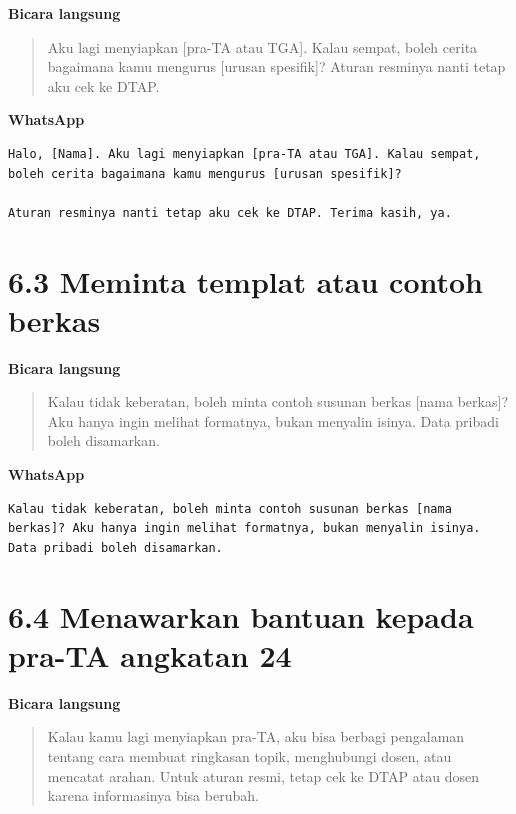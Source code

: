 \documentclass[
  indonesian,
]{article}
\renewcommand{\subsection}{\section}
\begin{document}
\textbf{Bicara langsung}

\begin{quote}
Aku lagi menyiapkan {[}pra-TA atau TGA{]}. Kalau sempat, boleh cerita
bagaimana kamu mengurus {[}urusan spesifik{]}? Aturan resminya nanti
tetap aku cek ke DTAP.
\end{quote}

\textbf{WhatsApp}

\begin{verbatim}
Halo, [Nama]. Aku lagi menyiapkan [pra-TA atau TGA]. Kalau sempat, boleh cerita bagaimana kamu mengurus [urusan spesifik]?

Aturan resminya nanti tetap aku cek ke DTAP. Terima kasih, ya.
\end{verbatim}

\subsection{6.3 Meminta templat atau contoh
berkas}\label{meminta-templat-atau-contoh-berkas}

\textbf{Bicara langsung}

\begin{quote}
Kalau tidak keberatan, boleh minta contoh susunan berkas {[}nama
berkas{]}? Aku hanya ingin melihat formatnya, bukan menyalin isinya.
Data pribadi boleh disamarkan.
\end{quote}

\textbf{WhatsApp}

\begin{verbatim}
Kalau tidak keberatan, boleh minta contoh susunan berkas [nama berkas]? Aku hanya ingin melihat formatnya, bukan menyalin isinya. Data pribadi boleh disamarkan.
\end{verbatim}

\subsection{6.4 Menawarkan bantuan kepada pra-TA angkatan
24}\label{menawarkan-bantuan-kepada-pra-ta-angkatan-24}

\textbf{Bicara langsung}

\begin{quote}
Kalau kamu lagi menyiapkan pra-TA, aku bisa berbagi pengalaman tentang
cara membuat ringkasan topik, menghubungi dosen, atau mencatat arahan.
Untuk aturan resmi, tetap cek ke DTAP atau dosen karena informasinya
bisa berubah.
\end{quote}
\end{document}
